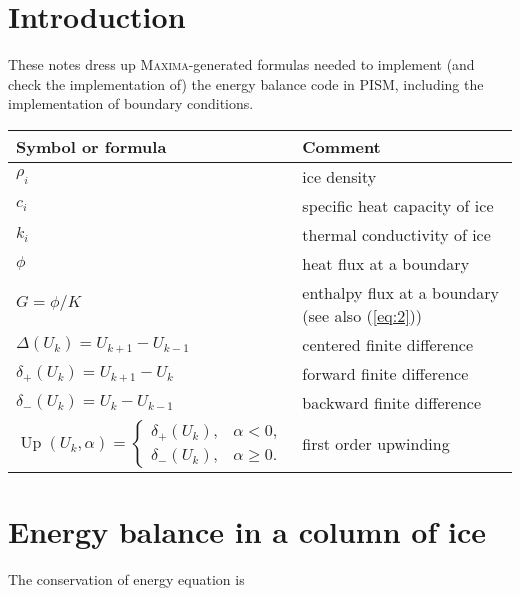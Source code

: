 \documentclass{article}
\begin{document}
\pagestyle{fancy}

\section{Introduction}
\label{sec:introduction}

These notes dress up \textsc{Maxima}-generated formulas needed to
implement (and check the implementation of) the energy balance code in
PISM, including the implementation of boundary conditions.

\begin{center}
  \begin{tabular}{ll}
    Symbol or formula & Comment \\
    \hline
    $\rho_{i}$ & ice density\\
    $c_{i}$ & specific heat capacity of ice\\
    $k_{i}$ & thermal conductivity of ice\\
    $\phi$ & heat flux at a boundary\\
    $G = \phi / K$ & enthalpy flux at a boundary (see also (\ref{eq:2}))\\
    $\Delta(U_{k}) = U_{k+1} - U_{k-1}$ & centered finite difference\\
    $\delta_{+}(U_{k}) = U_{k+1} - U_{k}$ & forward finite difference\\
    $\delta_{-}(U_{k}) = U_{k} - U_{k-1}$ & backward finite difference\\
    $\operatorname{Up}(U_{k}, \alpha) =
    \begin{cases}
      \delta_{+}(U_{k}), & \alpha < 0,\\
      \delta_{-}(U_{k}), & \alpha \ge 0.
    \end{cases}$ & first order upwinding\\
  \end{tabular}
\end{center}

\section{Energy balance in a column of ice}
\label{sec:energy-in-a-column}

The conservation of energy equation is
\end{document}

